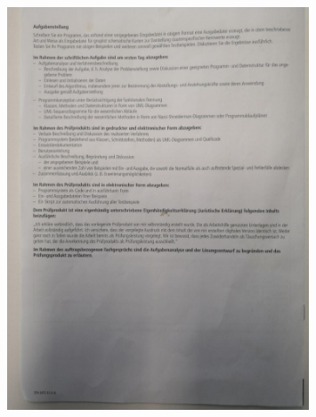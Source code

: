 \begin{figure}[htb]
    \centering
    \includegraphics[width=0.8\textwidth,]{./aufgabenstellung/8.jpg}
\end{figure}
